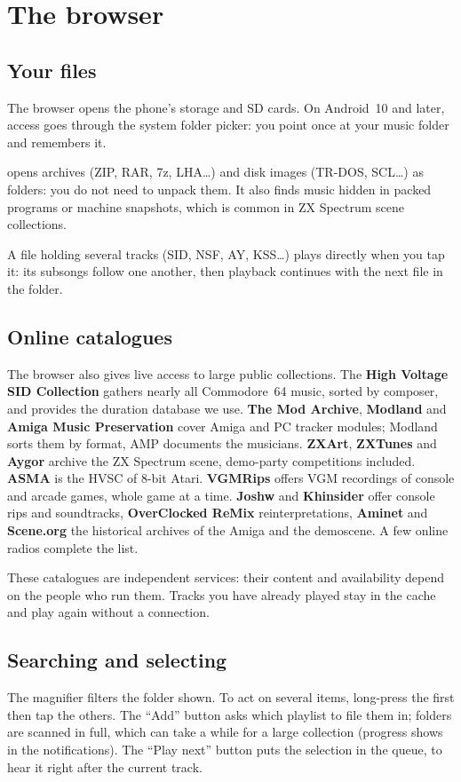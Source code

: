 \chapter{The browser}

\section{Your files}
The browser opens the phone's storage and SD cards. On Android~10 and later, access goes through the system folder
picker: you point once at your music folder and \soft remembers it.

\soft opens archives (ZIP, RAR, 7z, LHA\dots) and disk images (TR-DOS, SCL\dots) as folders: you do not need to
unpack them. It also finds music hidden in packed programs or machine snapshots, which is common in ZX Spectrum scene
collections.

A file holding several tracks (SID, NSF, AY, KSS\dots) plays directly when you tap it: its subsongs follow one
another, then playback continues with the next file in the folder.

\section{Online catalogues}
The browser also gives live access to large public collections. The \textbf{High Voltage SID Collection} gathers
nearly all Commodore~64 music, sorted by composer, and provides the duration database we use. \textbf{The Mod
Archive}, \textbf{Modland} and \textbf{Amiga Music Preservation} cover Amiga and PC tracker modules; Modland sorts
them by format, AMP documents the musicians. \textbf{ZXArt}, \textbf{ZXTunes} and \textbf{Aygor} archive the ZX
Spectrum scene, demo-party competitions included. \textbf{ASMA} is the HVSC of 8-bit Atari. \textbf{VGMRips} offers
VGM recordings of console and arcade games, whole game at a time. \textbf{Joshw} and \textbf{Khinsider} offer
console rips and soundtracks, \textbf{OverClocked ReMix} reinterpretations, \textbf{Aminet} and \textbf{Scene.org}
the historical archives of the Amiga and the demoscene. A few online radios complete the list.

These catalogues are independent services: their content and availability depend on the people who run them. Tracks
you have already played stay in the cache and play again without a connection.

\section{Searching and selecting}
The magnifier filters the folder shown. To act on several items, long-press the first then tap the others. The
``Add'' button asks which playlist to file them in; folders are scanned in full, which can take a while for a large
collection (progress shows in the notifications). The ``Play next'' button puts the selection in the queue, to hear
it right after the current track.
